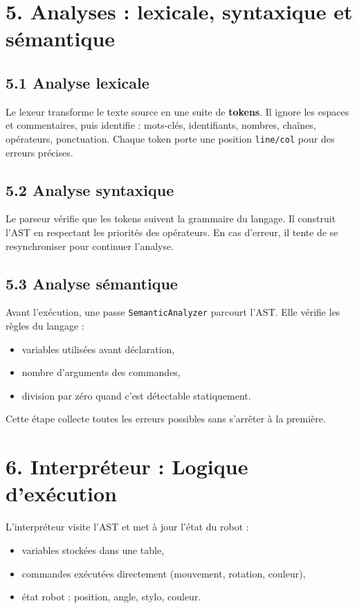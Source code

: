 \documentclass[11pt,a4paper]{article}
\begin{document}
\section*{5. Analyses : lexicale, syntaxique et sémantique}

\subsection*{5.1 Analyse lexicale}
Le lexeur transforme le texte source en une suite de \textbf{tokens}.  
Il ignore les espaces et commentaires, puis identifie : mots-clés, identifiants, nombres, chaînes, opérateurs, ponctuation.  
Chaque token porte une position \texttt{line/col} pour des erreurs précises.

\subsection*{5.2 Analyse syntaxique}
Le parseur vérifie que les tokens suivent la grammaire du langage.  
Il construit l’AST en respectant les priorités des opérateurs.  
En cas d’erreur, il tente de se resynchroniser pour continuer l’analyse.

\subsection*{5.3 Analyse sémantique}
Avant l’exécution, une passe \texttt{SemanticAnalyzer} parcourt l’AST.  
Elle vérifie les règles du langage :
\begin{itemize}[leftmargin=1.2cm]
  \item variables utilisées avant déclaration,
  \item nombre d’arguments des commandes,
  \item division par zéro quand c’est détectable statiquement.
\end{itemize}
Cette étape collecte toutes les erreurs possibles sans s’arrêter à la première.

\section*{6. Interpréteur : Logique d’exécution}
L’interpréteur visite l’AST et met à jour l’état du robot :
\begin{itemize}[leftmargin=1.2cm]
  \item variables stockées dans une table,
  \item commandes exécutées directement (mouvement, rotation, couleur),
  \item état robot : position, angle, stylo, couleur.
\end{itemize}
\end{document}
